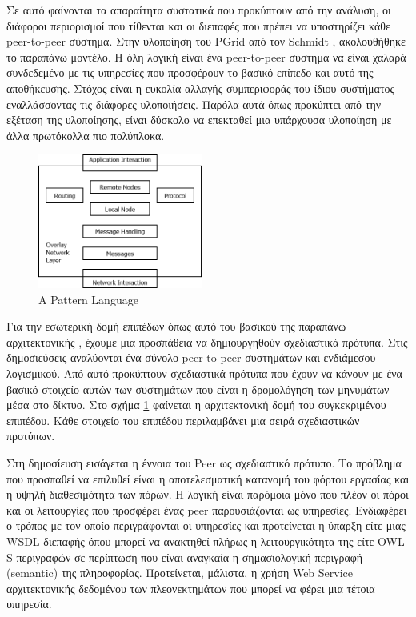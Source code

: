 Σε αυτό φαίνονται τα απαραίτητα συστατικά που προκύπτουν από την 
ανάλυση, οι διάφοροι περιορισμοί που τίθενται και οι διεπαφές που πρέπει 
να υποστηρίζει κάθε peer-to-peer σύστημα. Στην υλοποίηση του PGrid από 
τον Schmidt \citep{Schmidt2007}, ακολουθήθηκε το παραπάνω 
μοντέλο. Η όλη λογική είναι ένα peer-to-peer σύστημα να είναι χαλαρά 
συνδεδεμένο με τις υπηρεσίες που προσφέρουν το βασικό επίπεδο και αυτό 
της αποθήκευσης. Στόχος είναι η ευκολία αλλαγής συμπεριφοράς του ίδιου 
συστήματος εναλλάσσοντας τις διάφορες υλοποιήσεις. Παρόλα αυτά όπως 
προκύπτει από την εξέταση της υλοποίησης, είναι δύσκολο να επεκταθεί μια 
υπάρχουσα υλοποίηση με άλλα πρωτόκολλα πιο πολύπλοκα.

\begin{figure}
  \begin{center}
    \includegraphics[width=0.48\textwidth]{Figures/Related_work/A_pattern_language.png}
  \end{center}
  \caption{A Pattern Language}
  \label{fig:Patterns}
\end{figure}

Για την εσωτερική δομή επιπέδων όπως αυτό του βασικού της παραπάνω 
αρχιτεκτονικής , έχουμε μια προσπάθεια να δημιουργηθούν σχεδιαστικά 
πρότυπα. Στις δημοσιεύσεις \citep{Grolimund2005, Grolimund2006} αναλύονται 
ένα σύνολο peer-to-peer συστημάτων και ενδιάμεσου λογισμικού. Από αυτό 
προκύπτουν σχεδιαστικά πρότυπα που έχουν να κάνουν με ένα βασικό στοιχείο 
αυτών των συστημάτων που είναι η δρομολόγηση των μηνυμάτων μέσα στο δίκτυο. 
Στο σχήμα \ref{fig:Patterns} φαίνεται η αρχιτεκτονική δομή του συγκεκριμένου επιπέδου. 
Κάθε στοιχείο του επιπέδου περιλαμβάνει μια σειρά σχεδιαστικών προτύπων. 

Στη δημοσίευση \citep{Amoretti2005} εισάγεται η έννοια 
του Peer ως σχεδιαστικό πρότυπο. Το πρόβλημα που προσπαθεί να επιλυθεί 
είναι η αποτελεσματική κατανομή του φόρτου εργασίας και η υψηλή 
διαθεσιμότητα των πόρων. Η λογική είναι παρόμοια μόνο που πλέον οι πόροι 
και οι λειτουργίες που προσφέρει ένας peer παρουσιάζονται ως υπηρεσίες. 
Ενδιαφέρει ο τρόπος με τον οποίο περιγράφονται οι υπηρεσίες και 
προτείνεται η ύπαρξη είτε μιας WSDL διεπαφής όπου μπορεί να ανακτηθεί 
πλήρως η λειτουργικότητα της είτε OWL-S περιγραφών σε περίπτωση που 
είναι αναγκαία η σημασιολογική περιγραφή (semantic) της πληροφορίας. 
Προτείνεται, μάλιστα, η χρήση Web Service αρχιτεκτονικής δεδομένου των 
πλεονεκτημάτων που μπορεί να φέρει μια τέτοια υπηρεσία. 

